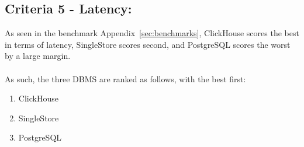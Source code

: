 \subsection{Criteria 5 - Latency:}
As seen in the benchmark Appendix~\ref{sec:benchmarks}, ClickHouse scores the best in terms of latency, SingleStore scores second, and PostgreSQL scores the worst by a large margin.
\\\\
As such, the three DBMS are ranked as follows, with the best first:

\begin{enumerate}
    \item ClickHouse
    \item SingleStore
    \item PostgreSQL
\end{enumerate}